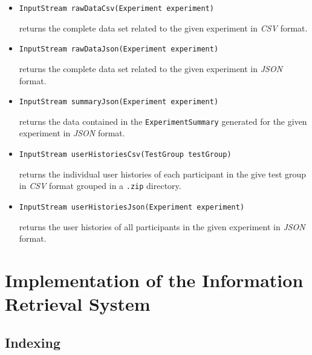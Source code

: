 \documentclass[a4paper]{usiinfbachelorproject}
\begin{document}
\begin{description}
        \begin{itemize}

            \item \texttt{InputStream rawDataCsv(Experiment experiment)} 

                    returns the complete data set related to the given experiment in \emph{CSV} format.

            \item \texttt{InputStream rawDataJson(Experiment experiment)}

                    returns the complete data set related to the given experiment in \emph{JSON} format.

            \item \texttt{InputStream summaryJson(Experiment experiment)}

                    returns the data contained in the \texttt{ExperimentSummary} generated for the given experiment in \emph{JSON} format.

            \item \texttt{InputStream userHistoriesCsv(TestGroup testGroup)}

                    returns the individual user histories of each participant in the give test group in \emph{CSV} format 
                    grouped in a \texttt{.zip} directory.

            \item \texttt{InputStream userHistoriesJson(Experiment experiment)}

                    returns the user histories of all participants in the given experiment in \emph{JSON} format.

        \end{itemize}

\end{description}


\newpage

\section{\textbf{Implementation of the Information Retrieval System}} \label{sec:impl}

\subsection{\textbf{Indexing}} \label{sec:implIndexing}
\end{document}
